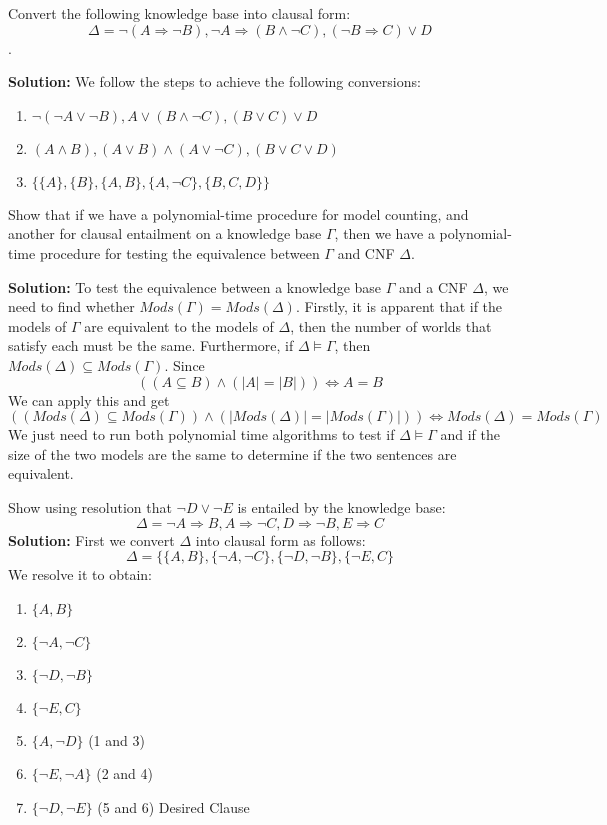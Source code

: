 \documentclass[11pt]{exam}
\begin{document}
\begin{questions}
\question[8] Convert the following knowledge base into clausal form:
$$\Delta = \lnot (A \Rightarrow\lnot B), \lnot A \Rightarrow (B \land \lnot C), (\lnot B \Rightarrow C) \lor D$$.

\textbf{Solution:} We follow the steps to achieve the following conversions:
\begin{enumerate}
\item $\lnot (\lnot A \lor \lnot B), A \lor (B \land \lnot C), (B \lor C) \lor D$
\item $(A \land B), (A \lor B) \land (A \lor \lnot C), (B \lor C \lor D)$
\item $\{\{A\}, \{B\}, \{A,B\}, \{A, \lnot C\}, \{B,C,D\}\}$
\end{enumerate}
\vspace{1em}

\question[8] Show that if we have a polynomial-time procedure for model counting, and another for clausal entailment on a knowledge base $\Gamma$, then we have a polynomial-time procedure for testing the equivalence between $\Gamma$ and CNF $\Delta$.
\vspace{1em}

\textbf{Solution:} To test the equivalence between a knowledge base $\Gamma$ and a CNF $\Delta$, we need to find whether $Mods(\Gamma) = Mods(\Delta)$. Firstly, it is apparent that if the models of $\Gamma$ are equivalent to the models of $\Delta$, then the number of worlds that satisfy each must be the same. Furthermore, if $\Delta \models \Gamma$, then $Mods(\Delta) \subseteq Mods(\Gamma)$. Since
$$((A \subseteq B) \land (\lvert A \rvert = \lvert B \rvert))\iff A = B$$
We can apply this and get
$$((Mods(\Delta) \subseteq Mods(\Gamma)) \land (\lvert Mods(\Delta)\rvert = \lvert Mods(\Gamma) \rvert)) \iff Mods(\Delta) = Mods(\Gamma)$$
We just need to run both polynomial time algorithms to test if $\Delta \models \Gamma$ and if the size of the two models are the same to determine if the two sentences are equivalent.
\vspace{1em}

\question[10] Show using resolution that $\lnot D \lor \lnot E$ is entailed by the knowledge base:
$$\Delta = \lnot A \Rightarrow B, A \Rightarrow \lnot C, D \Rightarrow \lnot B, E \Rightarrow C$$
\textbf{Solution:} First we convert $\Delta$ into clausal form as follows:
$$\Delta = \{\{A,B\}, \{\lnot A, \lnot C\}, \{\lnot D, \lnot B\},\{\lnot E, C\}$$
We resolve it to obtain:
\begin{enumerate}
    \item $\{A,B\}$
    \item $\{\lnot A, \lnot C\}$
    \item $\{\lnot D, \lnot B\}$
    \item $\{\lnot E, C\}$
    \item $\{A, \lnot D\}$ (1 and 3)
    \item $\{\lnot E, \lnot A\}$ (2 and 4)
    \item $\{\lnot D, \lnot E\}$ (5 and 6) Desired Clause
\end{enumerate}

\end{questions}
\end{document}

